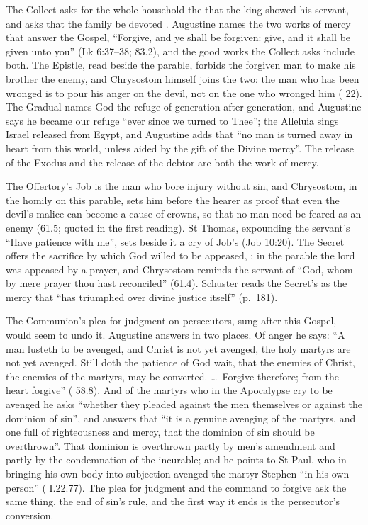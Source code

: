 The Collect asks for the whole household the  that the king
showed his servant, and asks that the family be devoted .
Augustine names the two works of mercy that answer the Gospel, ``Forgive, and ye
shall be forgiven: give, and it shall be given unto you'' (Lk 6:37--38; 
83.2), and the good works the Collect asks include both. The Epistle, read beside
the parable, forbids the forgiven man to make his brother the enemy, and
Chrysostom himself joins the two: the man who has been wronged is to pour his
anger on the devil, not on the one who wronged him (
22). The Gradual names God the refuge of generation after generation, and
Augustine says he became our refuge ``ever since we turned to Thee''; the Alleluia
sings Israel released from Egypt, and Augustine adds that ``no man is turned away
in heart from this world, unless aided by the gift of the Divine mercy''. The
release of the Exodus and the release of the debtor are both the work of mercy.

The Offertory's Job is the man who bore injury without sin, and Chrysostom, in
the homily on this parable, sets him before the hearer as proof that even the
devil's malice can become a cause of crowns, so that no man need be feared as an
enemy (61.5; quoted in the first reading). St Thomas, expounding the servant's ``Have patience with
me'', sets beside it a cry of Job's (Job 10:20). The Secret offers the sacrifice
by which God willed to be appeased, ; in the
parable the lord was appeased by a prayer, and Chrysostom reminds the servant of
``God, whom by mere prayer thou hast reconciled'' (61.4). Schuster reads the
Secret's  as the mercy that ``has triumphed over divine
justice itself'' (p.~181).

The Communion's plea for judgment on persecutors, sung after this Gospel, would
seem to undo it. Augustine answers in two places. Of anger he says: ``A man
lusteth to be avenged, and Christ is not yet avenged, the holy martyrs are not yet
avenged. Still doth the patience of God wait, that the enemies of Christ, the
enemies of the martyrs, may be converted. \dots\ Forgive therefore; from the heart
forgive'' ( 58.8). And of the martyrs who in the Apocalypse cry to
be avenged he asks ``whether they pleaded against the men themselves or against
the dominion of sin'', and answers that ``it is a genuine avenging of the martyrs,
and one full of righteousness and mercy, that the dominion of sin should be
overthrown''. That dominion is overthrown partly by men's amendment and partly by
the condemnation of the incurable; and he points to St Paul, who in bringing his
own body into subjection avenged the martyr Stephen ``in his own person''
( I.22.77). The plea for judgment and the
command to forgive ask the same thing, the end of sin's rule, and the first way
it ends is the persecutor's conversion.

